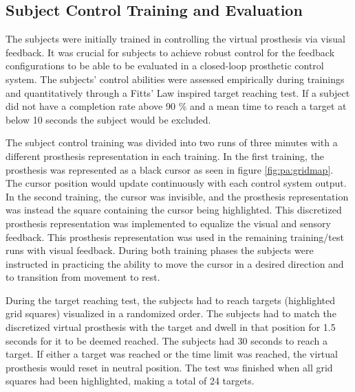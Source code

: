 \subsection{Subject Control Training and Evaluation} \label{sec:pa:subjectcontrol}
The subjects were initially trained in controlling the virtual prosthesis via visual feedback. It was crucial for subjects to achieve robust control for the feedback configurations to be able to be evaluated in a closed-loop prosthetic control system. The subjects' control abilities were assessed empirically during trainings and quantitatively through a Fitts' Law inspired target reaching test. If a subject did not have a completion rate above 90 $\%$ and a mean time to reach a target at below 10 seconds the subject would be excluded. 

The subject control training was divided into two runs of three minutes with a different prosthesis representation in each training. In the first training, the prosthesis was represented as a black cursor as seen in figure \ref{fig:pa:gridmap}. The cursor position would update continuously with each control system output. In the second training, the cursor was invisible, and the prosthesis representation was instead the square containing the cursor being highlighted. This discretized prosthesis representation was implemented to equalize the visual and sensory feedback. This prosthesis representation was used in the remaining training/test runs with visual feedback. During both training phases the subjects were instructed in practicing the ability to move the cursor in a desired direction and to transition from movement to rest. 

During the target reaching test, the subjects had to reach targets (highlighted grid squares) visualized in a randomized order. The subjects had to match the discretized virtual prosthesis with the target and dwell in that position for 1.5 seconds for it to be deemed reached. The subjects had 30 seconds to reach a target. If either a target was reached or the time limit was reached, the virtual prosthesis would reset in neutral position. The test was finished when all grid squares had been highlighted, making a total of 24 targets. 